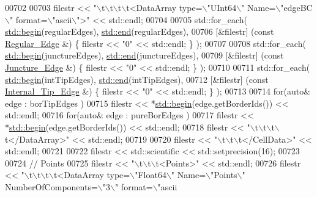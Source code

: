 \begin{DoxyCode}
00702 
00703     filestr << \textcolor{stringliteral}{"\(\backslash\)t\(\backslash\)t\(\backslash\)t\(\backslash\)t<DataArray type=\(\backslash\)"UInt64\(\backslash\)" Name=\(\backslash\)"edgeBC\(\backslash\)" format=\(\backslash\)"ascii\(\backslash\)">"} << std::endl;
00704 
00705     std::for\_each( \hyperlink{namespacestd_acec9a198880c12f51f02be95a298a48b}{std::begin}(regularEdges), \hyperlink{namespacestd_aeb4b319cf9afda99ba1f47d32df15bc9}{std::end}(regularEdges),
00706                    [&filestr] (\textcolor{keyword}{const} \hyperlink{classFVCode3D_1_1Rigid__Mesh_1_1Regular__Edge}{Regular\_Edge} &) \{ filestr << \textcolor{stringliteral}{"0"} << std::endl; \} );
00707 
00708     std::for\_each( \hyperlink{namespacestd_acec9a198880c12f51f02be95a298a48b}{std::begin}(junctureEdges), \hyperlink{namespacestd_aeb4b319cf9afda99ba1f47d32df15bc9}{std::end}(junctureEdges),
00709                    [&filestr] (\textcolor{keyword}{const} \hyperlink{classFVCode3D_1_1Rigid__Mesh_1_1Juncture__Edge}{Juncture\_Edge} &) \{ filestr << \textcolor{stringliteral}{"0"} << std::endl; \} );
00710 
00711     std::for\_each( \hyperlink{namespacestd_acec9a198880c12f51f02be95a298a48b}{std::begin}(intTipEdges), \hyperlink{namespacestd_aeb4b319cf9afda99ba1f47d32df15bc9}{std::end}(intTipEdges),
00712                    [&filestr] (\textcolor{keyword}{const} \hyperlink{classFVCode3D_1_1Rigid__Mesh_1_1Internal__Tip__Edge}{Internal\_Tip\_Edge} &) \{ filestr << \textcolor{stringliteral}{"0"} << std::endl; \}
       );
00713 
00714     \textcolor{keywordflow}{for}(\textcolor{keyword}{auto}& edge : borTipEdges )
00715         filestr << *\hyperlink{namespacestd_acec9a198880c12f51f02be95a298a48b}{std::begin}(edge.getBorderIds()) << std::endl;
00716     \textcolor{keywordflow}{for}(\textcolor{keyword}{auto}& edge : pureBorEdges )
00717         filestr << *\hyperlink{namespacestd_acec9a198880c12f51f02be95a298a48b}{std::begin}(edge.getBorderIds()) << std::endl;
00718     filestr << \textcolor{stringliteral}{"\(\backslash\)t\(\backslash\)t\(\backslash\)t\(\backslash\)t</DataArray>"} << std::endl;
00719 
00720     filestr << \textcolor{stringliteral}{"\(\backslash\)t\(\backslash\)t\(\backslash\)t</CellData>"} << std::endl;
00721 
00722     filestr << std::scientific << std::setprecision(16);
00723 
00724     \textcolor{comment}{// Points}
00725     filestr << \textcolor{stringliteral}{"\(\backslash\)t\(\backslash\)t\(\backslash\)t<Points>"} << std::endl;
00726     filestr << \textcolor{stringliteral}{"\(\backslash\)t\(\backslash\)t\(\backslash\)t\(\backslash\)t<DataArray type=\(\backslash\)"Float64\(\backslash\)" Name=\(\backslash\)"Points\(\backslash\)" NumberOfComponents=\(\backslash\)"3\(\backslash\)" format=\(\backslash\)"ascii
}
\end{DoxyCode}
